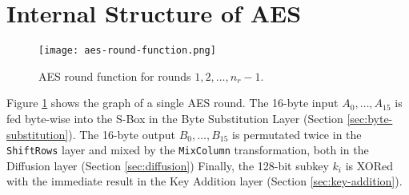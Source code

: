 \section{Internal Structure of AES}

\begin{figure}[h] %
    \centering
    \texttt{[image: aes-round-function.png]} %
    \caption{
        AES round function for rounds $1, 2, \dots, n_r-1$.
    }
    \label{fig:aes-round-function} %
\end{figure}

Figure \ref{fig:aes-round-function} shows the graph of a single AES round. 
The 16-byte input $A_0, \dots, A_{15}$ is fed byte-wise into the S-Box in the Byte Substitution Layer (Section \ref{sec:byte-substitution}).
The 16-byte output $B_0, \dots, B_{15}$ is permutated twice in the \texttt{ShiftRows} layer and mixed by the \texttt{MixColumn} transformation, both in the Diffusion layer (Section \ref{sec:diffusion})
Finally, the 128-bit subkey $k_i$ is XORed with the immediate result in the Key Addition layer (Section \ref{sec:key-addition}).






